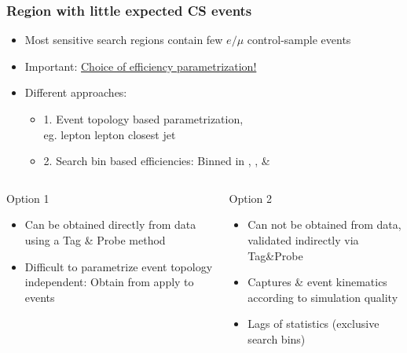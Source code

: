 \documentclass{beamer}
\begin{document}
\begin{frame}
 \frametitle{Region with little expected CS events}
 \begin{itemize}
  \item Most sensitive search regions contain few $e/\mu$ control-sample events
  \item Important: \underline{Choice of efficiency parametrization!}
  \item Different approaches:
  \begin{itemize}
   \item 1. Event topology based parametrization,\\ eg. \pt lepton \deltaR lepton closest jet
   \item 2. Search bin based efficiencies: Binned in \HT, \MHT, \NJets \& \BTags
  \end{itemize}
 \end{itemize}
 \noindent\makebox[\linewidth]{\rule{\textwidth}{0.4pt}}
 \begin{columns}
  \begin{column}{0.465\textwidth}
  Option 1
   \begin{itemize}
    \item Can be obtained directly from data using a Tag \& Probe method
    \item Difficult to parametrize event topology independent: Obtain from \Zll apply to \ttbar \wpj events
   \end{itemize}

  \end{column}
  \begin{column}{0.535\textwidth}
     Option 2
   \begin{itemize}
    \item Can not be obtained from data, validated indirectly via Tag\&Probe
    \item Captures \ttbar \& \wpj event kinematics according to simulation quality
    \item Lags of statistics (exclusive search bins)
   \end{itemize}
  \end{column}

 \end{columns}
\end{frame}
\end{document}
